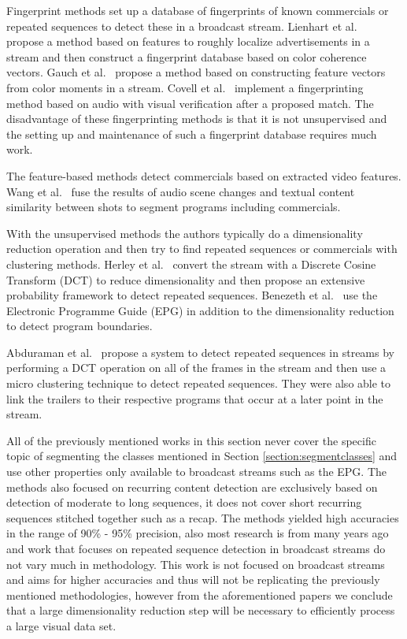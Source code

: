 \documentclass{article}
\begin{document}
Fingerprint methods set up a database of fingerprints of known commercials or repeated sequences to detect these in a broadcast stream. Lienhart et al.\ \cite{lienhart1997detection} propose a method based on features to roughly localize advertisements in a stream and then construct a fingerprint database based on color coherence vectors. Gauch et al.\ \cite{gauch2006finding} propose a method based on constructing feature vectors from color moments in a stream. Covell et al.\ \cite{covell2006advertisement} implement a fingerprinting method based on audio with visual verification after a proposed match. The disadvantage of these fingerprinting methods is that it is not unsupervised and the setting up and maintenance of such a fingerprint database requires much work.


The feature-based methods detect commercials based on extracted video features. Wang et al.\ \cite{wang2008multimodal} fuse the results of audio scene changes and textual content similarity between shots to segment programs including commercials.

With the unsupervised methods the authors typically do a dimensionality reduction operation and then try to find repeated sequences or commercials with clustering methods. Herley et al.\ \cite{herley2006argos} convert the stream with a Discrete Cosine Transform (DCT) to reduce dimensionality and then propose an extensive probability framework to detect repeated sequences. Benezeth et al.\ \cite{benezeth2010unsupervised} use the Electronic Programme Guide (EPG) in addition to the dimensionality reduction to detect program boundaries.

Abduraman et al.\ \cite{abduraman2011unsupervised} propose a system to detect repeated sequences in streams by performing a DCT operation on all of the frames in the stream and then use a micro clustering technique to detect repeated sequences. They were also able to link the trailers to their respective programs that occur at a later point in the stream.

All of the previously mentioned works in this section never cover the specific topic of segmenting the classes mentioned in Section \ref{section:segmentclasses} and use other properties only available to broadcast streams such as the EPG. The methods also focused on recurring content detection are exclusively based on detection of moderate to long sequences, it does not cover short recurring sequences stitched together such as a recap. The methods yielded high accuracies in the range of 90\% - 95\% precision, also most research is from many years ago and work that focuses on repeated sequence detection in broadcast streams do not vary much in methodology. This work is not focused on broadcast streams and aims for higher accuracies and thus will not be replicating the previously mentioned methodologies, however from the aforementioned papers we conclude that a large dimensionality reduction step will be necessary to efficiently process a large visual data set.
\\
\end{document}

